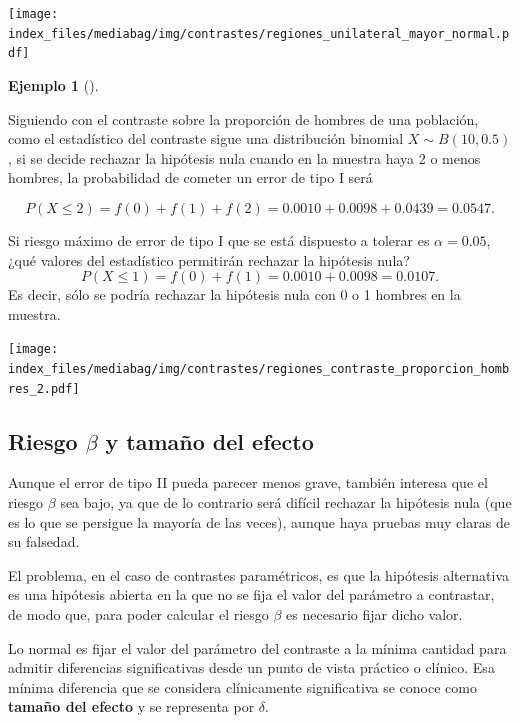 \documentclass[
  a4paper,
]{scrreport}
\theoremstyle{plain}
\theoremstyle{definition}
\newtheorem{example}{Ejemplo}[chapter]
\theoremstyle{definition}
\theoremstyle{remark}
\begin{document}
\begin{center}
\texttt{[image: index\_files/mediabag/img/contrastes/regiones\_unilateral\_mayor\_normal.pdf]}
\end{center}

\begin{example}[]\protect\hypertarget{exm-regiones-aceptacion-rechazo}{}\label{exm-regiones-aceptacion-rechazo}

Siguiendo con el contraste sobre la proporción de hombres de una
población, como el estadístico del contraste sigue una distribución
binomial \(X\sim B(10,0.5)\), si se decide rechazar la hipótesis nula
cuando en la muestra haya 2 o menos hombres, la probabilidad de cometer
un error de tipo I será

\[P(X\leq 2)= f(0)+f(1)+f(2)= 0.0010 + 0.0098 + 0.0439 = 0.0547.\]

Si riesgo máximo de error de tipo I que se está dispuesto a tolerar es
\(\alpha=0.05\), ¿qué valores del estadístico permitirán rechazar la
hipótesis nula? \[P(X\leq 1)= f(0)+f(1) = 0.0010 + 0.0098 = 0.0107.\] Es
decir, sólo se podría rechazar la hipótesis nula con 0 o 1 hombres en la
muestra.

\begin{center}
\texttt{[image: index\_files/mediabag/img/contrastes/regiones\_contraste\_proporcion\_hombres\_2.pdf]}
\end{center}

\end{example}

\subsection{\texorpdfstring{Riesgo \(\beta\) y tamaño del
efecto}{Riesgo \textbackslash beta y tamaño del efecto}}\label{riesgo-beta-y-tamauxf1o-del-efecto}

Aunque el error de tipo II pueda parecer menos grave, también interesa
que el riesgo \(\beta\) sea bajo, ya que de lo contrario será difícil
rechazar la hipótesis nula (que es lo que se persigue la mayoría de las
veces), aunque haya pruebas muy claras de su falsedad.

El problema, en el caso de contrastes paramétricos, es que la hipótesis
alternativa es una hipótesis abierta en la que no se fija el valor del
parámetro a contrastar, de modo que, para poder calcular el riesgo
\(\beta\) es necesario fijar dicho valor.

Lo normal es fijar el valor del parámetro del contraste a la mínima
cantidad para admitir diferencias significativas desde un punto de vista
práctico o clínico. Esa mínima diferencia que se considera clínicamente
significativa se conoce como \textbf{tamaño del efecto} y se representa
por \(\delta\).
\end{document}

